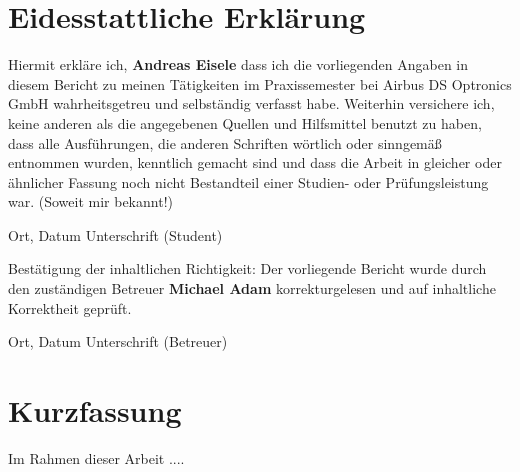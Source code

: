 \documentclass[12pt,a4paper]{scrreprt}
\begin{document}
\newpage
\chapter{Eidesstattliche Erklärung}


\begin{minipage}{0.99\textwidth}

Hiermit erkläre ich, \textbf{Andreas Eisele}
dass ich die vorliegenden Angaben in diesem Bericht
zu meinen Tätigkeiten im Praxissemester bei
Airbus DS Optronics GmbH
wahrheitsgetreu und selbständig verfasst habe.
Weiterhin versichere ich, keine anderen als die angegebenen Quellen und Hilfsmittel benutzt zu haben, dass alle Ausführungen, die anderen Schriften wörtlich oder sinngemäß entnommen wurden, kenntlich gemacht sind und dass die Arbeit in gleicher oder ähnlicher Fassung noch nicht Bestandteil einer Studien- oder
Prüfungsleistung war. (Soweit mir bekannt!)

\vspace{2cm}

\end{minipage}

\begin{minipage}{0.99\textwidth}

Ort,  Datum \hspace{3cm} Unterschrift (Student)

\end{minipage}


\vspace{3cm}

\begin{minipage}{0.99\textwidth}

Bestätigung der inhaltlichen Richtigkeit:
Der vorliegende Bericht wurde durch den zuständigen Betreuer
\textbf{Michael Adam} korrekturgelesen und auf inhaltliche Korrektheit geprüft.

\vspace{2cm}

\end{minipage}


\begin{minipage}{0.99\textwidth}

Ort, Datum \hspace{3cm} Unterschrift (Betreuer)

\end{minipage}


\newpage
\chapter{Kurzfassung}
Im Rahmen dieser Arbeit ....
\end{document}

